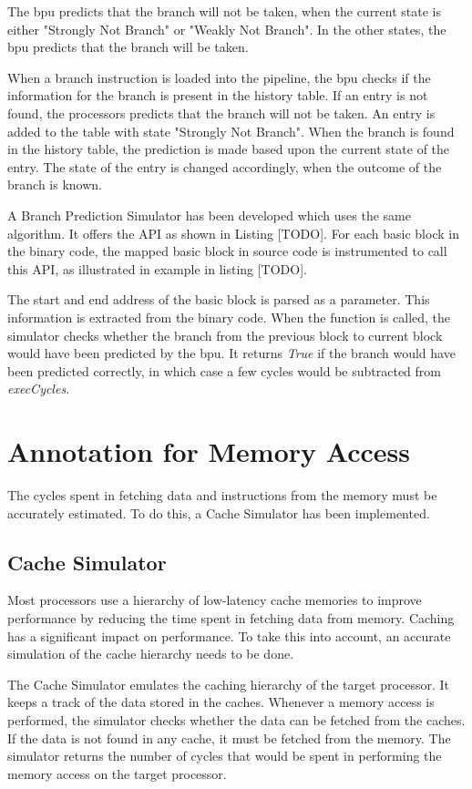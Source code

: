 The \gls{bpu} predicts that the branch will not be taken, when the current state is either "Strongly Not Branch" or "Weakly Not Branch". In the other states, the \gls{bpu} predicts that the branch will be taken.

When a branch instruction is loaded into the pipeline, the \gls{bpu} checks if the information for the branch is present in the history table. If an entry is not found, the processors predicts that the branch will not be taken. An entry is added to the table with state "Strongly Not Branch". When the branch is found in the history table, the prediction is made based upon the current state of the entry. The state of the entry is changed accordingly, when the outcome of the branch is known.

A Branch Prediction Simulator has been developed which uses the same algorithm. It offers the API as shown in Listing [TODO]. For each basic block in the binary code, the mapped basic block in source code is instrumented to call this API, as illustrated in example in listing [TODO]. 

The start and end address of the basic block is parsed as a parameter. This information is extracted from the binary code. When the function is called, the simulator checks whether the branch from the previous block to current block would have been predicted by the \gls{bpu}. It returns \emph{True} if the branch would have been predicted correctly, in which case a few cycles would be subtracted from \emph{execCycles}. 

\section{Annotation for Memory Access}
The cycles spent in fetching data and instructions from the memory must be accurately estimated. To do this, a Cache Simulator has been implemented. 

\subsection{Cache Simulator}
Most processors use a hierarchy of low-latency cache memories to improve performance by reducing the time spent in fetching data from memory. Caching has a significant impact on performance. To take this into account, an accurate simulation of the cache hierarchy needs to be done.

The Cache Simulator emulates the caching hierarchy of the target processor. It keeps a track of the data stored in the caches. Whenever a memory access is performed, the simulator checks whether the data can be fetched from the caches. If the data is not found in any cache, it must be fetched from the memory. The simulator returns the number of cycles that would be spent in performing the memory access on the target processor.

